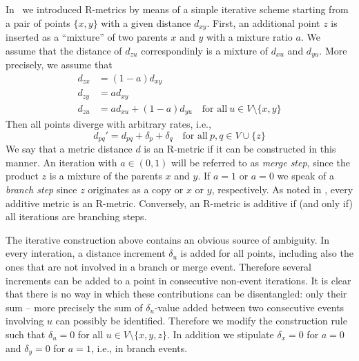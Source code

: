 \documentclass{article}
\begin{document}
In~\cite{Prohaska:17a} we introduced R-metrics by means of a simple
iterative scheme starting from a pair of points $\{x,y\}$ with a given
distance $d_{xy}$.  First, an additional point $z$ is inserted as a
``mixture'' of two parents $x$ and $y$ with a mixture ratio $a$. We assume
that the distance of $d_{zu}$ correspondinly is a mixture of $d_{xu}$ and
$d_{yu}$. More precisely, we assume that
\begin{equation} 
\begin{split} 
  d_{zx} & = (1-a)  d_{xy} \\
  d_{zy} & =   a    d_{xy} \\
  d_{zu} & =   a    d_{xu} + (1-a)  d_{yu} \quad\textrm{for all}\ 
                     u\in V\setminus\{ x,y \}
\end{split}
\end{equation} 
Then all points diverge with arbitrary rates, i.e., 
\begin{equation} 
  d_{pq}' = d_{pq} + \delta_p + \delta_q \quad\textrm{for all}\ 
  p,q \in V\cup\{z\} 
\end{equation} 
We say that a metric distance $d$ is an R-metric if it can be constructed
in this manner. An iteration with $a\in(0,1)$ will be referred to as
\emph{merge step}, since the product $z$ is a mixture of the parents $x$
and $y$. If $a=1$ or $a=0$ we speak of a \emph{branch step} since $z$
originates as a copy or $x$ or $y$, respectively. As noted in
\cite{Prohaska:17a}, every additive metric is an R-metric. Conversely, an
R-metric is additive if (and only if) all iterations are branching steps.

The iterative construction above contains an obvious source of ambiguity.
In every interation, a distance increment $\delta_u$ is added for all
points, including also the ones that are not involved in a branch or merge
event. Therefore several increments can be added to a point in consecutive
non-event iterations. It is clear that there is no way in which these
contributions can be disentangled: only their sum -- more precisely the sum
of $\delta_u$-value added between two consecutive events involving $u$ can
possibly be identified. Therefore we modify the construction rule such that
$\delta_u=0$ for all $u\in V\setminus\{x,y,z\}$. In addition we stipulate
$\delta_x=0$ for $a=0$ and $\delta_y=0$ for $a=1$, i.e., in branch events.
\end{document}
